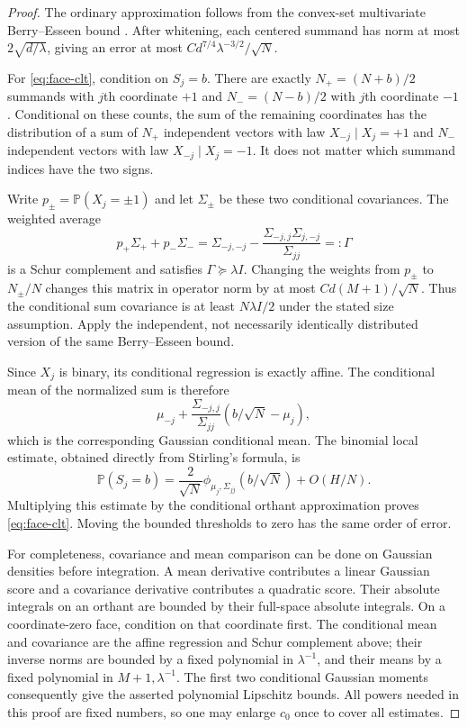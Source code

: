\documentclass[11pt]{article}
\theoremstyle{remark}\newtheorem{remark}[theorem]{Remark}
\newcommand{\Pp}{\mathbb P}
\begin{document}
\begin{proof}
The ordinary approximation follows from the convex-set multivariate
Berry--Esseen bound \cite{Bentkus}. After whitening, each centered
summand has norm at most $2\sqrt{d/\lambda}$, giving an error at most
$C d^{7/4}\lambda^{-3/2}/\sqrt N$.

For \eqref{eq:face-clt}, condition on $S_j=b$. There are exactly
$N_+=(N+b)/2$ summands with $j$th coordinate $+1$ and
$N_-=(N-b)/2$ with $j$th coordinate $-1$.
Conditional on these counts, the sum of the remaining coordinates has
the distribution of a sum of $N_+$ independent vectors with law
$X_{-j}\mid X_j=+1$ and $N_-$ independent vectors with law
$X_{-j}\mid X_j=-1$.
It does not matter which summand indices have the two signs.

Write $p_\pm=\Pp(X_j=\pm1)$ and let $\Sigma_\pm$ be these two conditional
covariances. The weighted average
\[
 p_+\Sigma_++p_-\Sigma_-
 =\Sigma_{-j,-j}-\frac{\Sigma_{-j,j}\Sigma_{j,-j}}{\Sigma_{jj}}
 =:\Gamma
\]
is a Schur complement and satisfies $\Gamma\succeq\lambda I$.
Changing the weights from $p_\pm$ to $N_\pm/N$ changes this matrix
in operator norm by at most $C d(M+1)/\sqrt N$.
Thus the conditional sum covariance is at least $N\lambda I/2$ under
the stated size assumption. Apply the independent, not necessarily
identically distributed version of the same Berry--Esseen bound.

Since $X_j$ is binary, its conditional regression is exactly affine.
The conditional mean of the normalized sum is therefore
\[
 \mu_{-j}+\frac{\Sigma_{-j,j}}{\Sigma_{jj}}
                (b/\sqrt N-\mu_j),
\]
which is the corresponding Gaussian conditional mean.
The binomial local estimate, obtained directly from Stirling's formula,
is
\[
 \Pp(S_j=b)=\frac2{\sqrt N}
       \phi_{\mu_j,\Sigma_{jj}}(b/\sqrt N)+O(H/N).
\]
Multiplying this estimate by the conditional orthant approximation proves
\eqref{eq:face-clt}. Moving the bounded thresholds to zero has the same
order of error.

For completeness, covariance and mean comparison can be done on Gaussian
densities before integration. A mean derivative contributes a linear
Gaussian score and a covariance derivative contributes a quadratic score.
Their absolute integrals on an orthant are bounded by their full-space
absolute integrals. On a coordinate-zero face, condition on that
coordinate first. The conditional mean and covariance are the affine
regression and Schur complement above; their inverse norms are bounded
by a fixed polynomial in $\lambda^{-1}$, and their means by a fixed
polynomial in $M+1,\lambda^{-1}$. The first two conditional Gaussian
moments consequently give the asserted polynomial Lipschitz bounds.
All powers needed in this proof are fixed numbers, so one may enlarge
$c_0$ once to cover all estimates.
\end{proof}
\end{document}
